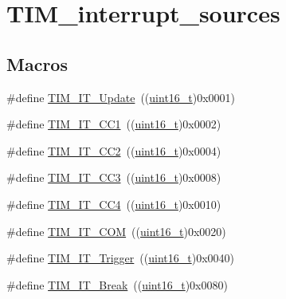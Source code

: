 \hypertarget{group___t_i_m__interrupt__sources}{}\section{T\+I\+M\+\_\+interrupt\+\_\+sources}
\label{group___t_i_m__interrupt__sources}
\subsection*{Macros}
\begin{DoxyCompactItemize}
\item 
\#define \hyperlink{group___t_i_m__interrupt__sources_ga8fb63577fec9a3e7c7f5f3eb775ee624}{T\+I\+M\+\_\+\+I\+T\+\_\+\+Update}~((\hyperlink{_p_e___types_8h_a1f1825b69244eb3ad2c7165ddc99c956}{uint16\+\_\+t})0x0001)
\item 
\#define \hyperlink{group___t_i_m__interrupt__sources_ga02267a938ab4722c5013fffa447cf5a6}{T\+I\+M\+\_\+\+I\+T\+\_\+\+C\+C1}~((\hyperlink{_p_e___types_8h_a1f1825b69244eb3ad2c7165ddc99c956}{uint16\+\_\+t})0x0002)
\item 
\#define \hyperlink{group___t_i_m__interrupt__sources_ga60f6b6c424b62ca58d3fafd8f5955e4f}{T\+I\+M\+\_\+\+I\+T\+\_\+\+C\+C2}~((\hyperlink{_p_e___types_8h_a1f1825b69244eb3ad2c7165ddc99c956}{uint16\+\_\+t})0x0004)
\item 
\#define \hyperlink{group___t_i_m__interrupt__sources_ga6aef020aebafd9e585283fbbaf8b841f}{T\+I\+M\+\_\+\+I\+T\+\_\+\+C\+C3}~((\hyperlink{_p_e___types_8h_a1f1825b69244eb3ad2c7165ddc99c956}{uint16\+\_\+t})0x0008)
\item 
\#define \hyperlink{group___t_i_m__interrupt__sources_ga1dce7f1bc32a258f2964cb7c05f413a6}{T\+I\+M\+\_\+\+I\+T\+\_\+\+C\+C4}~((\hyperlink{_p_e___types_8h_a1f1825b69244eb3ad2c7165ddc99c956}{uint16\+\_\+t})0x0010)
\item 
\#define \hyperlink{group___t_i_m__interrupt__sources_gaeb7eff6c39922814e7ee47c0820c3d9f}{T\+I\+M\+\_\+\+I\+T\+\_\+\+C\+OM}~((\hyperlink{_p_e___types_8h_a1f1825b69244eb3ad2c7165ddc99c956}{uint16\+\_\+t})0x0020)
\item 
\#define \hyperlink{group___t_i_m__interrupt__sources_ga339629d21f2490729b28905f5c04bad1}{T\+I\+M\+\_\+\+I\+T\+\_\+\+Trigger}~((\hyperlink{_p_e___types_8h_a1f1825b69244eb3ad2c7165ddc99c956}{uint16\+\_\+t})0x0040)
\item 
\#define \hyperlink{group___t_i_m__interrupt__sources_gad16adab3ac1a4a552a86da069702f24b}{T\+I\+M\+\_\+\+I\+T\+\_\+\+Break}~((\hyperlink{_p_e___types_8h_a1f1825b69244eb3ad2c7165ddc99c956}{uint16\+\_\+t})0x0080)

\end{DoxyCompactItemize}

